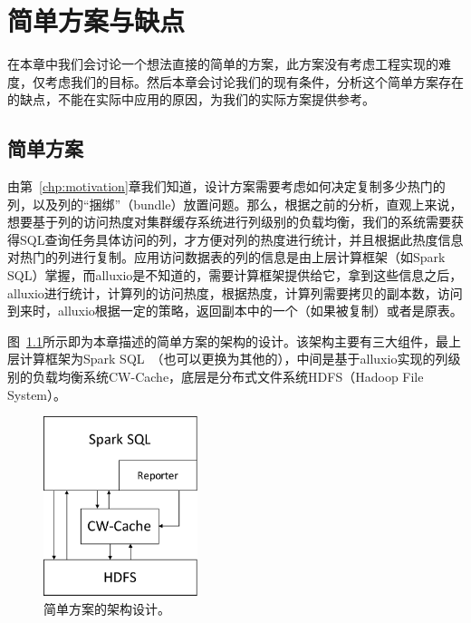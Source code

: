 \chapter{简单方案与缺点}
\label{chp:simple-solution}

\par 在本章中我们会讨论一个想法直接的简单的方案，此方案没有考虑工程实现的难度，仅考虑我们的目标。然后本章会讨论我们的现有条件，分析这个简单方案存在的缺点，不能在实际中应用的原因，为我们的实际方案提供参考。

\section{简单方案}

\par 由第~\ref{chp:motivation}章我们知道，设计方案需要考虑如何决定复制多少热门的列，以及列的“捆绑”（bundle）放置问题。那么，根据之前的分析，直观上来说，想要基于列的访问热度对集群缓存系统进行列级别的负载均衡，我们的系统需要获得SQL查询任务具体访问的列，才方便对列的热度进行统计，并且根据此热度信息对热门的列进行复制。应用访问数据表的列的信息是由上层计算框架（如Spark SQL）掌握，而alluxio是不知道的，需要计算框架提供给它，拿到这些信息之后，alluxio进行统计，计算列的访问热度，根据热度，计算列需要拷贝的副本数，访问到来时，alluxio根据一定的策略，返回副本中的一个（如果被复制）或者是原表。


\par 图~\ref{fig:sim-archi}所示即为本章描述的简单方案的架构的设计。该架构主要有三大组件，最上层计算框架为Spark SQL~\cite{spark-sql}（也可以更换为其他的），中间是基于alluxio\cite{alluxio}实现的列级别的负载均衡系统CW-Cache，底层是分布式文件系统HDFS（Hadoop File System）\cite{hdfs}。

\begin{figure}[]
	\centering
	\includegraphics[width=0.4\textwidth]{img/simple-solution/sim-archi}
	
	\caption{简单方案的架构设计。}
	\label{fig:sim-archi}
\end{figure}

